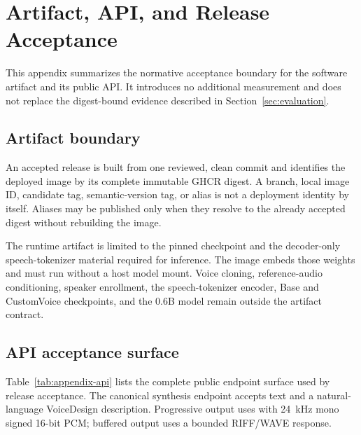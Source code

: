 \section{Artifact, API, and Release Acceptance}
\label{app:acceptance}

This appendix summarizes the normative acceptance boundary for the software
artifact and its public API. It introduces no additional measurement and does
not replace the digest-bound evidence described in
Section~\ref{sec:evaluation}.

\subsection{Artifact boundary}

An accepted release is built from one reviewed, clean  commit and
identifies the deployed image by its complete immutable GHCR digest. A branch,
local image ID, candidate tag, semantic-version tag, or  alias is
not a deployment identity by itself. Aliases may be published only when they
resolve to the already accepted digest without rebuilding the image.

The runtime artifact is limited to the pinned \modelname{} checkpoint
and the decoder-only speech-tokenizer material required for inference. The
image embeds those weights and must run without a host model mount. Voice
cloning, reference-audio conditioning, speaker enrollment, the speech-tokenizer
encoder, Base and CustomVoice checkpoints, and the 0.6B model remain outside
the artifact contract.

\subsection{API acceptance surface}

Table~\ref{tab:appendix-api} lists the complete public endpoint surface used by
release acceptance. The canonical synthesis endpoint accepts text and a
natural-language VoiceDesign description. Progressive output uses
 with 24~kHz mono signed 16-bit PCM; buffered output uses
a bounded RIFF/WAVE response.

